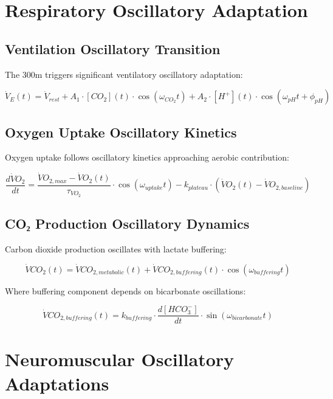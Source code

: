 \documentclass[12pt]{article}
\begin{document}
\section{Respiratory Oscillatory Adaptation}

\subsection{Ventilation Oscillatory Transition}

The 300m triggers significant ventilatory oscillatory adaptation:

\begin{equation}
\dot{V}_E(t) = \dot{V}_{rest} + A_1 \cdot [CO_2](t) \cdot \cos(\omega_{CO_2}t) + A_2 \cdot [H^+](t) \cdot \cos(\omega_{pH}t + \phi_{pH})
\end{equation}

\subsection{Oxygen Uptake Oscillatory Kinetics}

Oxygen uptake follows oscillatory kinetics approaching aerobic contribution:

\begin{equation}
\frac{d\dot{V}O_2}{dt} = \frac{\dot{V}O_{2,max} - \dot{V}O_2(t)}{\tau_{VO_2}} \cdot \cos(\omega_{uptake}t) - k_{plateau} \cdot \left(\dot{V}O_2(t) - \dot{V}O_{2,baseline}\right)
\end{equation}

\subsection{CO₂ Production Oscillatory Dynamics}

Carbon dioxide production oscillates with lactate buffering:

\begin{equation}
\dot{V}CO_2(t) = \dot{V}CO_{2,metabolic}(t) + \dot{V}CO_{2,buffering}(t) \cdot \cos(\omega_{buffering}t)
\end{equation}

Where buffering component depends on bicarbonate oscillations:

\begin{equation}
\dot{V}CO_{2,buffering}(t) = k_{buffering} \cdot \frac{d[HCO_3^-]}{dt} \cdot \sin(\omega_{bicarbonate}t)
\end{equation}

\section{Neuromuscular Oscillatory Adaptations}
\end{document}
